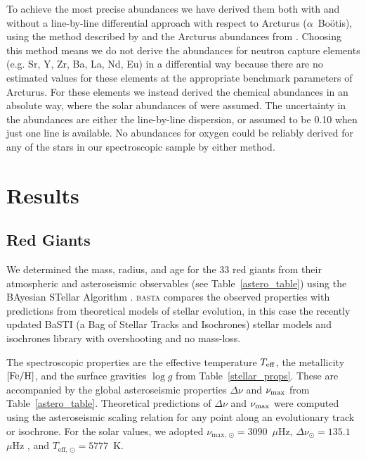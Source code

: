 \documentclass[a4paper,fleqn,usenatbib]{mnras}
\newcommand{\numax}{\mbox{$\nu_{\rm max}$}\xspace}
\newcommand{\Dnu}{\mbox{$\Delta \nu$}\xspace}
\newcommand{\teff}{\mbox{$T_{\rm eff}$}\xspace}
\newcommand{\logg}{\mbox{$\log g$}\xspace}
\newcommand{\feh}{\mbox{$\rm{[Fe/H]}$}\xspace}
\begin{document}
To achieve the most precise abundances we have derived them both with and without a line-by-line differential approach with respect to Arcturus ($\alpha$~Bo\"{o}tis), using the method described by \citet{hawkinsapogee} and the Arcturus abundances from \citet{gaiabenchmark4}. Choosing this method means we do not derive the abundances for neutron capture  elements (e.g. Sr, Y, Zr, Ba, La, Nd, Eu) in a differential way because there are no estimated values for these elements at the appropriate benchmark parameters of Arcturus. For these elements we instead derived the chemical abundances in an absolute way, where the solar abundances of \cite{Asplund2005} were assumed. The uncertainty in the abundances are either the line-by-line dispersion, or assumed to be 0.10 when just one line is available. No abundances for oxygen could be reliably derived for any of the stars in our spectroscopic sample by either method.







\section{Results}
\label{targets}

\subsection{Red Giants}
\label{rgs}

We determined the mass, radius, and age for the 33 red giants from their atmospheric and asteroseismic observables (see Table~\ref{astero_table}) using the BAyesian STellar Algorithm \citep[\textsc{basta}][]{silvaaguirre2015,silvaaguirre2017}. \textsc{basta} compares the observed properties with predictions from theoretical models of stellar evolution, in this case the recently updated BaSTI (a Bag of Stellar Tracks and Isochrones) stellar models and isochrones library \citep{Hidalgo:2018dy} with overshooting and no mass-loss.

The spectroscopic properties are the effective temperature \teff, the metallicity \feh, and the surface gravities \logg from Table~\ref{stellar_props}. These are accompanied by the global asteroseismic properties \Dnu and \numax from Table~\ref{astero_table}. Theoretical predictions of \Dnu and \numax were computed using the asteroseismic scaling relation for any point along an evolutionary track or isochrone. For the solar values, we adopted $\nu_{\text{max, }\odot}=3090$~$\mu$Hz, $\Delta\nu_{\odot}=135.1$~$\mu$Hz \citep{huber2011}, and $T_{\text{eff, }\odot}=5777$~K.
\end{document}
